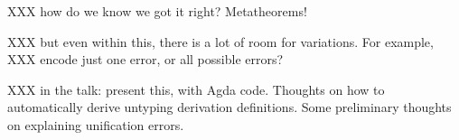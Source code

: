 \documentclass[sigplan, screen]{acmart}\settopmatter{printccs=false,printacmref=false}
\begin{document}
XXX how do we know we got it right?  Metatheorems!

XXX but even within this, there is a lot of room for variations.  For
example, XXX encode just one error, or all possible errors?

XXX in the talk:
present this, with Agda code.  Thoughts on how to automatically derive untyping
derivation definitions. Some preliminary thoughts on explaining unification errors.




\end{document}
